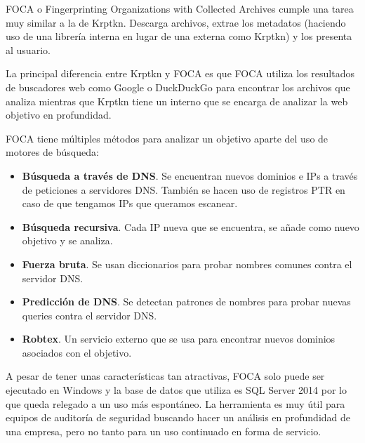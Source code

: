 FOCA o Fingerprinting Organizations with Collected Archives cumple una tarea muy similar a la de Krptkn. Descarga archivos, extrae los metadatos (haciendo uso de una librería interna en lugar de una externa como Krptkn) y los presenta al usuario.

La principal diferencia entre Krptkn y FOCA es que FOCA utiliza los resultados de buscadores web como Google o DuckDuckGo para encontrar los archivos que analiza mientras que Krptkn tiene un  interno que se encarga de analizar la web objetivo en profundidad.

FOCA tiene múltiples métodos para analizar un objetivo aparte del uso de motores de búsqueda:

\begin{itemize}
  \item \textbf{Búsqueda a través de DNS}. Se encuentran nuevos dominios e IPs a través de peticiones a servidores DNS. También se hacen uso de registros PTR en caso de que tengamos IPs que queramos escanear.
  \item \textbf{Búsqueda recursiva}. Cada IP nueva que se encuentra, se añade como nuevo objetivo y se analiza. 
  \item \textbf{Fuerza bruta}. Se usan diccionarios para probar nombres comunes contra el servidor DNS.
  \item \textbf{Predicción de DNS}. Se detectan patrones de nombres para probar nuevas queries contra el servidor DNS.
  \item \textbf{Robtex}. Un servicio externo que se usa para encontrar nuevos dominios asociados con el objetivo.
\end{itemize}

A pesar de tener unas características tan atractivas, FOCA solo puede ser ejecutado en Windows y la base de datos que utiliza es SQL Server 2014 por lo que queda relegado a un uso más espontáneo. La herramienta es muy útil para equipos de auditoría de seguridad buscando hacer un análisis en profundidad de una empresa, pero no tanto para un uso continuado en forma de servicio.
